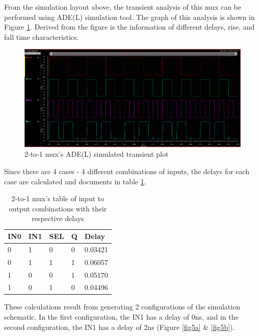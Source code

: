 \documentclass[letterpaper, 11pt]{article}
\begin{document}
From the simulation layout above, the transient analysis of this mux can be performed using ADE(L) simulation tool. The graph of this analysis is shown in Figure \ref{fig4}. Derived from the figure is the information of different delays, rise, and fall time characteristics.

\begin{figure}[htb!]
	\centering
	\includegraphics[width=0.8\linewidth]{mux_transient_init.png}
	\caption{2-to-1 mux's ADE(L) simulated transient plot}
	\label{fig4}
\end{figure}


Since there are 4 cases - 4 different combinations of inputs, the delays for each case are calculated and documents in table \ref{table2}. 

\begin{table}[htb!]
	\centering
	\begin{tabular}{l|l|l|l|l}
		IN0 & IN1 & SEL & Q & Delay\\ \hline
		0 & 1 & 0 & 0 & 0.03421 \\
		0 & 1 & 1 & 1 & 0.06057 \\
		1 & 0 & 0 & 1 & 0.05170 \\
		1 & 0 & 1 & 0 & 0.04496
	\end{tabular}
	\caption{2-to-1 mux's table of input to output combinations with their respective delays}
	\label{table2}
\end{table}

These calculations result from generating 2 configurations of the simulation schematic. In the first configuration, the IN1 has a delay of 0ns, and in the second configuration, the IN1 has a delay of 2ns (Figure \ref{fig5a} \& \ref{fig5b}).
\end{document}
